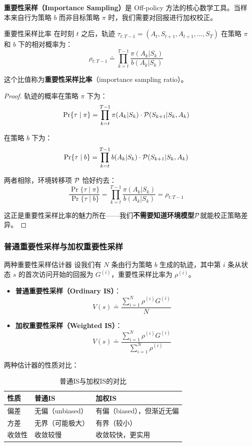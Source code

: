 \textbf{重要性采样（Importance Sampling）}是 Off-policy 方法的核心数学工具。当样本来自行为策略 $b$ 而非目标策略 $\pi$ 时，我们需要对回报进行加权校正。

\begin{mydefinition}{重要性采样比率}
在时刻 $t$ 之后，轨迹 $\tau_{t:T-1} = (A_t, S_{t+1}, A_{t+1}, \ldots, S_T)$ 在策略 $\pi$ 和 $b$ 下的相对概率为：
$$\rho_{t:T-1} \doteq \prod_{k=t}^{T-1} \frac{\pi(A_k|S_k)}{b(A_k|S_k)}$$

这个比值称为\textbf{重要性采样比率}（importance sampling ratio）。
\end{mydefinition}

\begin{proof}
轨迹的概率在策略 $\pi$ 下为：
$$\Pr\{\tau \mid \pi\} = \prod_{k=t}^{T-1} \pi(A_k|S_k) \cdot \mathcal{P}(S_{k+1}|S_k, A_k)$$

在策略 $b$ 下为：
$$\Pr\{\tau \mid b\} = \prod_{k=t}^{T-1} b(A_k|S_k) \cdot \mathcal{P}(S_{k+1}|S_k, A_k)$$

两者相除，环境转移项 $\mathcal{P}$ 恰好约去：
$$\frac{\Pr\{\tau \mid \pi\}}{\Pr\{\tau \mid b\}} = \prod_{k=t}^{T-1} \frac{\pi(A_k|S_k)}{b(A_k|S_k)} = \rho_{t:T-1}$$

这正是重要性采样比率的魅力所在——我们\textbf{不需要知道环境模型}$\mathcal{P}$就能校正策略差异。
\end{proof}

\subsubsection{普通重要性采样与加权重要性采样}

\begin{mydefinition}{两种重要性采样估计器}
设我们有 $N$ 条由行为策略 $b$ 生成的轨迹，其中第 $i$ 条从状态 $s$ 的首次访问开始的回报为 $G^{(i)}$，重要性采样比率为 $\rho^{(i)}$。

\begin{itemize}
    \item \textbf{普通重要性采样（Ordinary IS）}：
    $$V(s) \doteq \frac{\sum_{i=1}^{N} \rho^{(i)} G^{(i)}}{N}$$
    
    \item \textbf{加权重要性采样（Weighted IS）}：
    $$V(s) \doteq \frac{\sum_{i=1}^{N} \rho^{(i)} G^{(i)}}{\sum_{i=1}^{N} \rho^{(i)}}$$
\end{itemize}
\end{mydefinition}

两种估计器的性质对比：

\begin{table}[H]
\centering
\caption{普通IS与加权IS的对比}
\begin{tabular}{@{}lll@{}}
\toprule
性质 & 普通IS & 加权IS \\
\midrule
偏差 & 无偏（unbiased） & 有偏（biased），但渐近无偏 \\
方差 & 无界（可能极大） & 有界（较小） \\
收敛性 & 收敛较慢 & 收敛较快，更实用 \\
\bottomrule
\end{tabular}
\end{table}

